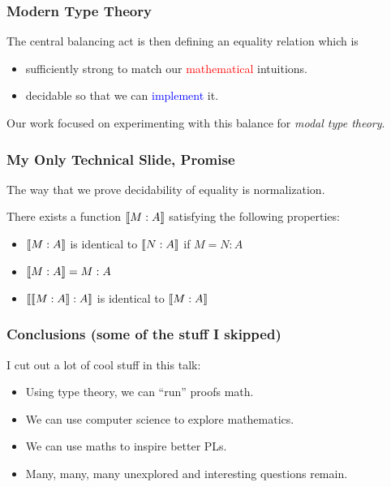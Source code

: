 \documentclass[usenames,dvipsnames,aspectratio=169,12pt]{beamer}
\begin{document}
\begin{frame}
  \frametitle{Modern Type Theory}
  The central balancing act is then defining an equality relation which is
  \begin{itemize}
  \item sufficiently strong to match our \textcolor{Red}{mathematical} intuitions.
  \item decidable so that we can \textcolor{Blue}{implement} it.
  \end{itemize}
  \bigskip

  Our work focused on experimenting with this balance for \emph{modal type theory}.
\end{frame}

\begin{frame}
  \frametitle{My Only Technical Slide, Promise}

  The way that we prove decidability of equality is normalization.
  \begin{theorem}[Normalization]
    There exists a function $\llbracket M : A \rrbracket$ satisfying the following properties:
    \begin{itemize}
    \item $\llbracket M : A \rrbracket$ is identical to $\llbracket N : A \rrbracket$ if $M = N : A$
    \item $\llbracket M : A \rrbracket = M : A$
    \item $\llbracket \llbracket M : A \rrbracket : A \rrbracket$ is identical to $\llbracket M : A \rrbracket$
    \end{itemize}
  \end{theorem}
\end{frame}

\begin{frame}
  \frametitle{Conclusions (some of the stuff I skipped)}
  I cut out a lot of cool stuff in this talk:
  \begin{itemize}
  \item Using type theory, we can ``run'' proofs math.
  \item We can use computer science to explore mathematics.
  \item We can use maths to inspire better PLs.
  \item Many, many, many unexplored and interesting questions remain.
  \end{itemize}
\end{frame}
\end{document}
